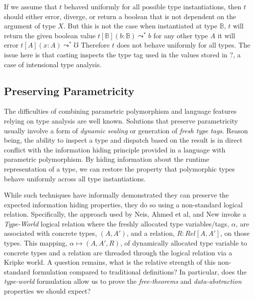 \documentclass[acmsmall]{acmart}
\begin{document}
If we assume that $t$ behaved uniformly for all possible type instantiations, then $t$ should either error, diverge,
or return a boolean that is not dependent on the argument of type $X$.
But this is not the case
when instantiated at type $\mathbb{B}$, $t$ will return the given boolean value
$t[\mathbb{B}](b : \mathbb{B}) \leadsto^* b$ for any other type $A$ it will error
$t[A](x:A)\leadsto^* \mho$
Therefore $t$ does not behave uniformly for all types. 
The issue here is that casting inspects the type tag used in the values stored in $?$, a case of intensional type analysis.

\subsection{Preserving Parametricity}

The difficulties of combining parametric polymorphism and language features relying on type analysis are well known\cite{NonParam}\cite{GradParam}\cite{ToroGradParam}\cite{ForFreeForFree}.
Solutions that preserve parametricity usually involve a form of \emph{dynamic sealing} or generation of \emph{fresh type tags}. Reason being, the ability to inspect a type and dispatch based on the result is in direct conflict with the information hiding principle provided in a language with parametric polymorphism. By hiding information about the runtime representation of a type, we can restore the property that polymorphic types behave uniformly across all type instantiations.

While such techniques have informally demonstrated they can preserve the expected information hiding properties, they do so using a non-standard logical relation. Specifically, the approach used by Neis\cite{NonParam}, Ahmed et al\cite{ForFreeForFree}, and New\cite{GradParam} invoke a \emph{Type-World} logical relation where the freshly allocated type variables/tags, $\alpha$, are associated with concrete types, $(A,A')$, and a relation, $R : Rel[A,A']$, on those types. This mapping, $\alpha \mapsto (A,A',R)$, of dynamically allocated type variable to concrete types and a relation are threaded through the logical relation via a Kripke world. A question remains, what is the relative strength of this non-standard formulation compared to traditional definitions? In particular, does the \emph{type-world} formulation allow us to prove the \emph{free-theorems} and \emph{data-abstraction} properties we should expect?
\end{document}
